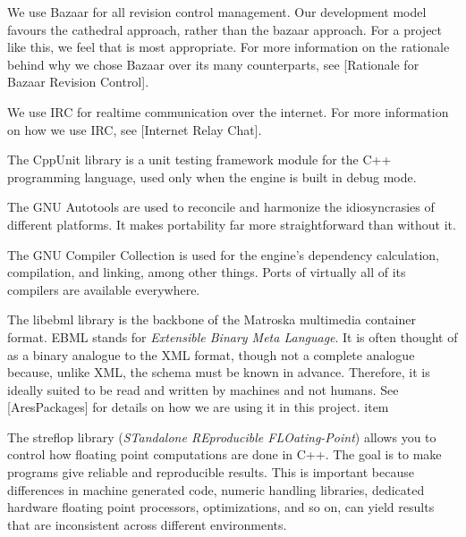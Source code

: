 
\startitemize[4]
\setupwhitespace[big]

We use Bazaar for all revision control management. Our development model favours the cathedral approach, rather than the bazaar approach. For a project like this, we feel that is most appropriate. For more information on the rationale behind why we chose Bazaar over its many counterparts, see [Rationale for Bazaar Revision Control].


We use IRC for realtime communication over the internet. For more information on how we use IRC, see [Internet Relay Chat].
\stopitemize


\startitemize[4]
\setupwhitespace[big]

The CppUnit library is a unit testing framework module for the C++ programming language, used only when the engine is built in debug mode.


The GNU Autotools are used to reconcile and harmonize the idiosyncrasies of different platforms. It makes portability far more straightforward than without it.


The GNU Compiler Collection is used for the engine's dependency calculation, compilation, and linking, among other things. Ports of virtually all of its compilers are available everywhere.


The libebml library is the backbone of the Matroska multimedia container format. EBML stands for {\it Extensible Binary Meta Language}. It is often thought of as a binary analogue to the XML format, though not a complete analogue because, unlike XML, the schema must be known in advance. Therefore, it is ideally suited to be read and written by machines and not humans. See [AresPackages] for details on how we are using it in this project.
item

The streflop library ({\it STandalone REproducible FLOating-Point}) allows you to control how floating point computations are done in C++. The goal is to make programs give reliable and reproducible results. This is important because differences in machine generated code, numeric handling libraries, dedicated hardware floating point processors, optimizations, and so on, can yield results that are inconsistent across different environments.

